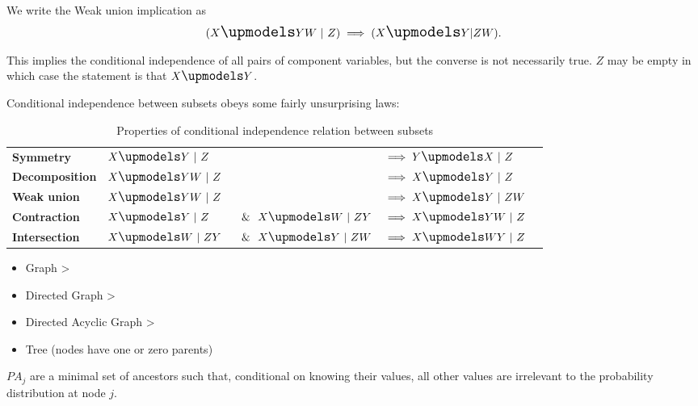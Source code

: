We write the Weak union implication as
  \begin{align*}
    (X \indep YW ~|~ Z) \implies (X \indep Y | ZW).
  \end{align*}









 This implies the conditional independence of all pairs of component variables,
but the converse is not necessarily true. $Z$ may be empty in which case the statement is that $X \indep Y$.

Conditional independence between subsets obeys some fairly unsurprising laws:


  \begin{table}[!h]
    \centering
    \begin{tabular}{|l|l l l l}
      {\bf Symmetry}      & $X \indep Y  ~|~ Z $&$                            $&$\implies Y \indep X  ~|~ Z   $ & \\
      {\bf Decomposition} & $X \indep YW ~|~ Z $&$                           $&$\implies X \indep Y  ~|~ Z   $ &\\
      {\bf Weak union}    & $X \indep YW ~|~ Z $&$                           $&$\implies X \indep Y  ~|~ ZW  $ &\\
      {\bf Contraction}   & $X \indep Y  ~|~ Z  $&$ ~~\&~~ X \indep W ~|~ ZY  $&$\implies X \indep YW ~|~ Z   $ & \\
      {\bf Intersection}  & $X \indep W  ~|~ ZY $&$ ~~\&~~ X \indep Y ~|~ ZW  $&$\implies X \indep WY ~|~ Z   $ &
  \end{tabular}
    \caption{Properties of conditional independence relation between subsets}
  \end{table}


\begin{itemize}
\item Graph >
\item Directed Graph >
\item Directed Acyclic Graph >
\item Tree (nodes have one or zero parents)
\end{itemize}

\begin{definition}[Parent]
 $PA_j$ are a minimal set of ancestors such that, conditional on knowing their values, all other
values are irrelevant to the probability distribution at node $j$.
\end{definition}

